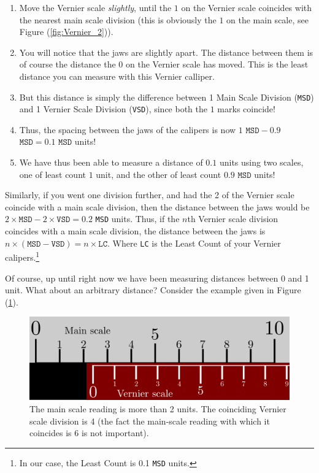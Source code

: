 \begin{enumerate}
    \item Move the Vernier scale \textit{slightly}, until the $1$ on the Vernier scale coincides with the nearest main scale division (this is obviously the $1$ on the main scale, see Figure (\ref{fig:Vernier_2})). 
    
    \item You will notice that the jaws are slightly apart. The distance between them is of course the distance the $0$ on the Vernier scale has moved. This is the least distance you can measure with this Vernier calliper.
    
    \item But this distance is simply the difference between 1 Main Scale Division (\texttt{MSD}) and 1 Vernier Scale Division (\texttt{VSD}), since both the $1$ marks coincide!
    
    \item Thus, the spacing between the jaws of the calipers is now $1$ $\texttt{MSD} - 0.9$ $\texttt{MSD} = 0.1$ $\texttt{MSD}$ units!
    
    \item We have thus been able to measure a distance of $0.1$ units using two scales, one of least count $1$ unit, and the other of least count $0.9$ $\texttt{MSD}$ units! 
    
\end{enumerate}

Similarly, if you went one division further, and had the 2 of the Vernier scale coincide with a main scale division, then the distance between the jaws would be $2\times\texttt{MSD}-2\times\texttt{VSD}=0.2$ \texttt{MSD} units. Thus, if the $n$th Vernier scale division coincides with a main scale division, the distance between the jaws is $n \times (\texttt{MSD}-\texttt{VSD})=n \times \texttt{LC}$. Where \texttt{LC} is the Least Count of your Vernier calipers.\footnote{In our case, the Least Count is 0.1 \texttt{MSD} units.}

Of course, up until right now we have been measuring distances between 0 and 1 unit.  What about an arbitrary distance? Consider the example given in Figure (\ref{fig:Vernier_4}). 

\begin{figure}[!htb]
    \centering
    \includegraphics[scale=0.75]{figs/Vernier4.png}
    \caption{The main scale reading is more than 2 units. The coinciding Vernier scale division is 4 (the fact the main-scale reading with which it coincides is 6 is not important).}
    \label{fig:Vernier_4}
\end{figure}

